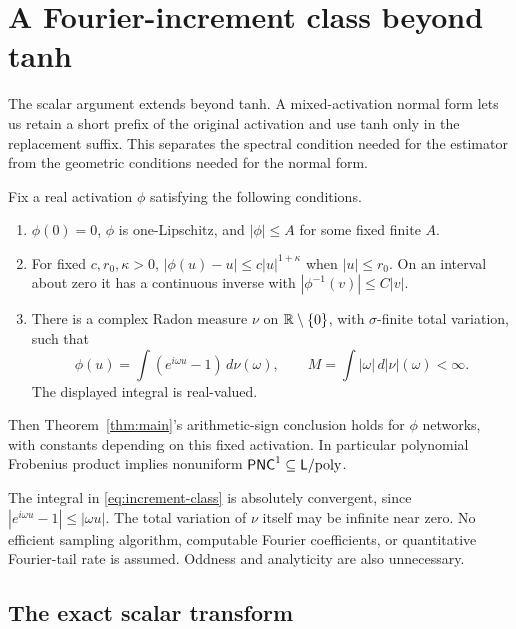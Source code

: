 \section{A Fourier-increment class beyond tanh}
\label{app:fourier-activations}

The scalar argument extends beyond tanh. A mixed-activation normal form
lets us retain a short prefix of the original activation and use tanh
only in the replacement suffix. This separates the spectral condition
needed for the estimator from the geometric conditions needed for the
normal form.

\begin{theorem}
\label{thm:fourier-class}
Fix a real activation $\phi$ satisfying the following conditions.
\begin{enumerate}[label=(\roman*)]
\item $\phi(0)=0$, $\phi$ is one-Lipschitz, and $|\phi|\le A$ for
some fixed finite $A$.
\item For fixed $c,r_0,\kappa>0$,
$|\phi(u)-u|\le c|u|^{1+\kappa}$ when $|u|\le r_0$.
On an interval about zero it has a continuous inverse with
$|\phi^{-1}(v)|\le C|v|$.
\item There is a complex Radon measure $\nu$ on $\mathbb R\setminus\{0\}$,
with $\sigma$-finite total variation, such that
\begin{equation}\label{eq:increment-class}
 \phi(u)=\int (e^{i\omega u}-1)\,d\nu(\omega),\qquad
 M=\int|\omega|\,d|\nu|(\omega)<\infty.
\end{equation}
The displayed integral is real-valued.
\end{enumerate}
Then Theorem~\ref{thm:main}'s arithmetic-sign conclusion holds for
$\phi$ networks, with constants depending on this fixed activation.
In particular polynomial Frobenius product implies nonuniform
$\mathsf{PNC}^1\subseteq\mathsf L/\mathrm{poly}$.
\end{theorem}

The integral in \eqref{eq:increment-class} is absolutely convergent,
since $|e^{i\omega u}-1|\le|\omega u|$. The total variation of $\nu$
itself may be infinite near zero. No efficient sampling algorithm,
computable Fourier coefficients, or quantitative Fourier-tail rate is
assumed. Oddness and analyticity are also unnecessary.

\subsection{The exact scalar transform}

